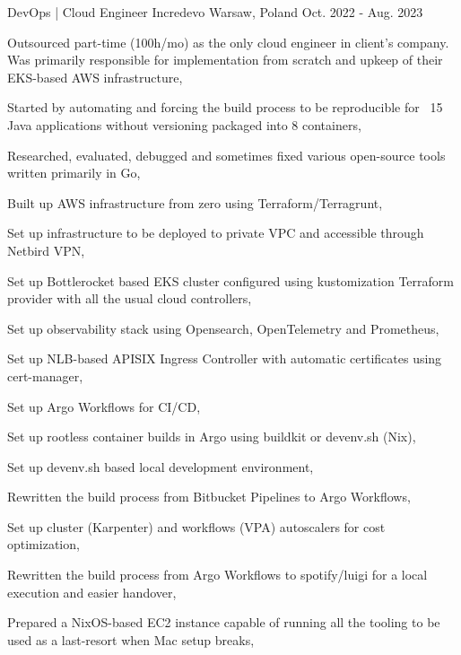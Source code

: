 \begin{cventries}
  \cventry
  {DevOps | Cloud Engineer} %
  {Incredevo} %
  {Warsaw, Poland} %
  {Oct. 2022 - Aug. 2023} %
  {
    \begin{cvitems} %
      \item {Outsourced part-time (100h/mo) as the only cloud engineer in client's company. Was primarily responsible for implementation from scratch and upkeep of their EKS-based AWS infrastructure,}
      \item {Started by automating and forcing the build process to be reproducible for ~15 Java applications without versioning packaged into 8 containers,}
      \item {Researched, evaluated, debugged and sometimes fixed various open-source tools written primarily in Go,}
      \item {Built up AWS infrastructure from zero using Terraform/Terragrunt,}
      \item {Set up infrastructure to be deployed to private VPC and accessible through Netbird VPN,}
      \item {Set up Bottlerocket based EKS cluster configured using kustomization Terraform provider with all the usual cloud controllers,}
      \item {Set up observability stack using Opensearch, OpenTelemetry and Prometheus,}
      \item {Set up NLB-based APISIX Ingress Controller with automatic certificates using cert-manager,}
      \item {Set up Argo Workflows for CI/CD,}
      \item {Set up rootless container builds in Argo using buildkit or devenv.sh (Nix),}
      \item {Set up devenv.sh based local development environment,}
      \item {Rewritten the build process from Bitbucket Pipelines to Argo Workflows,}
      \item {Set up cluster (Karpenter) and workflows (VPA) autoscalers for cost optimization,}
      \item {Rewritten the build process from Argo Workflows to spotify/luigi for a local execution and easier handover,}
      \item {Prepared a NixOS-based EC2 instance capable of running all the tooling to be used as a last-resort when Mac setup breaks,}
    \end{cvitems}
  }


\end{cventries}

